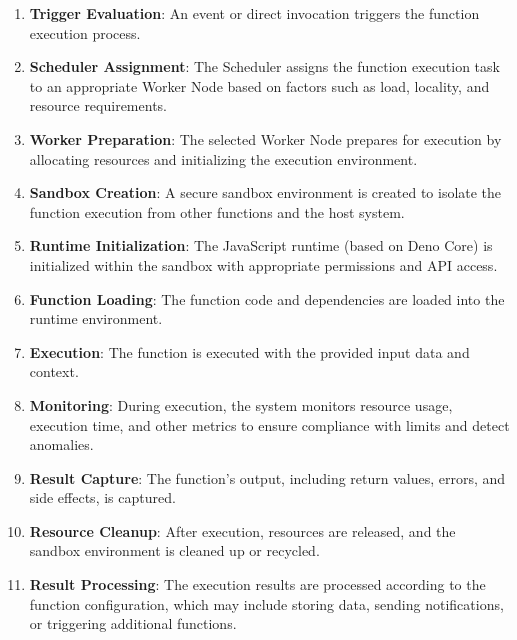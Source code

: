 \documentclass{article}
\begin{document}
\begin{enumerate}
    \item \textbf{Trigger Evaluation}: An event or direct invocation triggers the function execution process.
    
    \item \textbf{Scheduler Assignment}: The Scheduler assigns the function execution task to an appropriate Worker Node based on factors such as load, locality, and resource requirements.
    
    \item \textbf{Worker Preparation}: The selected Worker Node prepares for execution by allocating resources and initializing the execution environment.
    
    \item \textbf{Sandbox Creation}: A secure sandbox environment is created to isolate the function execution from other functions and the host system.
    
    \item \textbf{Runtime Initialization}: The JavaScript runtime (based on Deno Core) is initialized within the sandbox with appropriate permissions and API access.
    
    \item \textbf{Function Loading}: The function code and dependencies are loaded into the runtime environment.
    
    \item \textbf{Execution}: The function is executed with the provided input data and context.
    
    \item \textbf{Monitoring}: During execution, the system monitors resource usage, execution time, and other metrics to ensure compliance with limits and detect anomalies.
    
    \item \textbf{Result Capture}: The function's output, including return values, errors, and side effects, is captured.
    
    \item \textbf{Resource Cleanup}: After execution, resources are released, and the sandbox environment is cleaned up or recycled.
    
    \item \textbf{Result Processing}: The execution results are processed according to the function configuration, which may include storing data, sending notifications, or triggering additional functions.
\end{enumerate}
\end{document}
